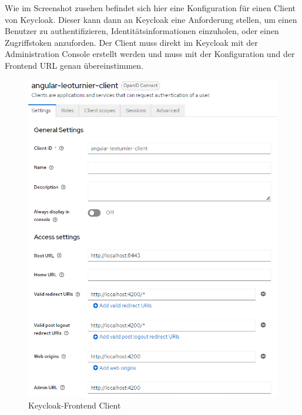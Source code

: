 Wie im Screenshot zusehen befindet sich hier eine Konfiguration für einen Client von Keycloak. Dieser kann dann an Keycloak eine Anforderung stellen, um einen Benutzer zu authentifizieren, Identitätsinformationen einzuholen, oder einen Zugriffstoken anzuforden.
Der Client muss direkt im Keycloak mit der Administration Console erstellt werden und muss mit der Konfiguration und der Frontend URL genau übereinstimmen.

\begin{figure}[H]
    \includegraphics[scale=0.7]{pics/frontend/keycloak_client.PNG}
    \caption{Keycloak-Frontend Client}
\end{figure}